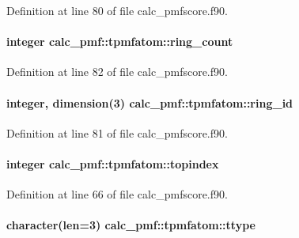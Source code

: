 Definition at line 80 of file calc\-\_\-pmfscore.\-f90.

\hypertarget{structcalc__pmf_1_1tpmfatom_a150b9a0df81b3f38699f8ebf5e071bd9}{
\paragraph[{ring\-\_\-count}]{\setlength{\rightskip}{0pt plus 5cm}integer calc\-\_\-pmf\-::tpmfatom\-::ring\-\_\-count}}\label{structcalc__pmf_1_1tpmfatom_a150b9a0df81b3f38699f8ebf5e071bd9}


Definition at line 82 of file calc\-\_\-pmfscore.\-f90.

\hypertarget{structcalc__pmf_1_1tpmfatom_af67413f119cdaddf756d2cf4d461872c}{
\paragraph[{ring\-\_\-id}]{\setlength{\rightskip}{0pt plus 5cm}integer, dimension(3) calc\-\_\-pmf\-::tpmfatom\-::ring\-\_\-id}}\label{structcalc__pmf_1_1tpmfatom_af67413f119cdaddf756d2cf4d461872c}


Definition at line 81 of file calc\-\_\-pmfscore.\-f90.

\hypertarget{structcalc__pmf_1_1tpmfatom_a4ad18214402af65031321b7ddd344b00}{
\paragraph[{topindex}]{\setlength{\rightskip}{0pt plus 5cm}integer calc\-\_\-pmf\-::tpmfatom\-::topindex}}\label{structcalc__pmf_1_1tpmfatom_a4ad18214402af65031321b7ddd344b00}


Definition at line 66 of file calc\-\_\-pmfscore.\-f90.

\hypertarget{structcalc__pmf_1_1tpmfatom_af07091b078c59160e3c3da81a42e98ad}{
\paragraph[{ttype}]{\setlength{\rightskip}{0pt plus 5cm}character(len=3) calc\-\_\-pmf\-::tpmfatom\-::ttype}}\label{structcalc__pmf_1_1tpmfatom_af07091b078c59160e3c3da81a42e98ad}



